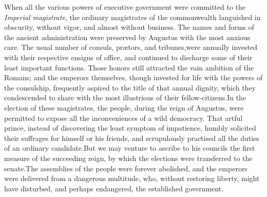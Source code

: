 When all the various powers of executive government were
committed to the \textit{Imperial magistrate}, the ordinary magistrates
of the commonwealth languished in obscurity, without vigor, and
almost without business. The names and forms of the ancient
administration were preserved by Augustus with the most anxious
care. The usual number of consuls, prætors, and tribunes,\footnotemark[15] were
annually invested with their respective ensigns of office, and
continued to discharge some of their least important functions.
Those honors still attracted the vain ambition of the Romans; and
the emperors themselves, though invested for life with the powers
of the consulship, frequently aspired to the title of that annual
dignity, which they condescended to share with the most
illustrious of their fellow-citizens.\footnotemark[16] In the election of these
magistrates, the people, during the reign of Augustus, were
permitted to expose all the inconveniences of a wild democracy.
That artful prince, instead of discovering the least symptom of
impatience, humbly solicited their suffrages for himself or his
friends, and scrupulously practised all the duties of an ordinary
candidate.\footnotemark[17] But we may venture to ascribe to his councils the
first measure of the succeeding reign, by which the elections
were transferred to the senate.\footnotemark[18] The assemblies of the people
were forever abolished, and the emperors were delivered from a
dangerous multitude, who, without restoring liberty, might have
disturbed, and perhaps endangered, the established government.



